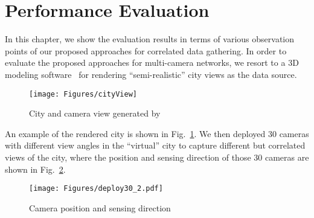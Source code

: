 \section{Performance Evaluation}
\label{sec::evaluation}
In this chapter, we show the evaluation results in terms of various observation points of our proposed approaches for correlated data gathering.
In order to evaluate the proposed approaches for multi-camera networks, we resort to a 3D modeling software~\cite{Suicidator,Blender} for rendering ``semi-realistic'' city views as the data source.
%
\begin{figure}
\begin{center}
\texttt{[image: Figures/cityView]}
\caption{\label{fig::cityView}City and camera view generated by~\cite{Suicidator,Blender}}
\end{center}
\end{figure}
%
An example of the rendered city is shown in Fig.~\ref{fig::cityView}.
We then deployed $30$ cameras with different view angles in the ``virtual'' city to capture different but correlated views of the city, where the position and sensing direction of those $30$ cameras are shown in Fig.~\ref{fig::deploy30}.
%
\begin{figure}
\begin{center}
\texttt{[image: Figures/deploy30\_2.pdf]}
\caption{\label{fig::deploy30}Camera position and sensing direction}
\end{center}
\end{figure}
%

